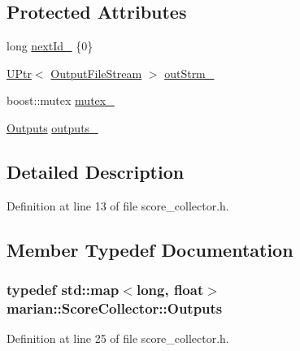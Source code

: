 \subsection*{Protected Attributes}
\begin{DoxyCompactItemize}
\item 
long \hyperlink{classmarian_1_1ScoreCollector_a68bf9186c90c33a7c44d263e58610f3b}{next\+Id\+\_\+} \{0\}
\item 
\hyperlink{namespacemarian_aef1c1bbe14b70285b1e8f7653f134cb1}{U\+Ptr}$<$ \hyperlink{classOutputFileStream}{Output\+File\+Stream} $>$ \hyperlink{classmarian_1_1ScoreCollector_a62fd57793146683d75456f0b18c0966e}{out\+Strm\+\_\+}
\item 
boost\+::mutex \hyperlink{classmarian_1_1ScoreCollector_a6ed0505c4c459cdaad1b39f86d36f1a4}{mutex\+\_\+}
\item 
\hyperlink{classmarian_1_1ScoreCollector_a0f23001507924b1866c1f6a370a2b369}{Outputs} \hyperlink{classmarian_1_1ScoreCollector_afb3b293c00d7e2b48fa65a32ac7461b7}{outputs\+\_\+}
\end{DoxyCompactItemize}


\subsection{Detailed Description}


Definition at line 13 of file score\+\_\+collector.\+h.



\subsection{Member Typedef Documentation}
\subsubsection[{\texorpdfstring{Outputs}{Outputs}}]{\setlength{\rightskip}{0pt plus 5cm}typedef std\+::map$<$long, float$>$ {\bf marian\+::\+Score\+Collector\+::\+Outputs}\hspace{0.3cm}{\ttfamily [protected]}}\hypertarget{classmarian_1_1ScoreCollector_a0f23001507924b1866c1f6a370a2b369}{}\label{classmarian_1_1ScoreCollector_a0f23001507924b1866c1f6a370a2b369}


Definition at line 25 of file score\+\_\+collector.\+h.



